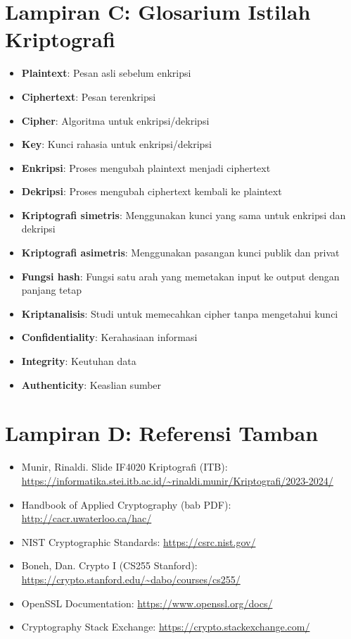 \documentclass[main.tex]{subfiles}
\begin{document}
\section*{Lampiran C: Glosarium Istilah Kriptografi}
\begin{itemize}
  \item \textbf{Plaintext}: Pesan asli sebelum enkripsi
  \item \textbf{Ciphertext}: Pesan terenkripsi
  \item \textbf{Cipher}: Algoritma untuk enkripsi/dekripsi
  \item \textbf{Key}: Kunci rahasia untuk enkripsi/dekripsi
  \item \textbf{Enkripsi}: Proses mengubah plaintext menjadi ciphertext
  \item \textbf{Dekripsi}: Proses mengubah ciphertext kembali ke plaintext
  \item \textbf{Kriptografi simetris}: Menggunakan kunci yang sama untuk enkripsi dan dekripsi
  \item \textbf{Kriptografi asimetris}: Menggunakan pasangan kunci publik dan privat
  \item \textbf{Fungsi hash}: Fungsi satu arah yang memetakan input ke output dengan panjang tetap
  \item \textbf{Kriptanalisis}: Studi untuk memecahkan cipher tanpa mengetahui kunci
  \item \textbf{Confidentiality}: Kerahasiaan informasi
  \item \textbf{Integrity}: Keutuhan data
  \item \textbf{Authenticity}: Keaslian sumber
\end{itemize}

\section*{Lampiran D: Referensi Tamban}
\begin{itemize}
  \item Munir, Rinaldi. Slide IF4020 Kriptografi (ITB): \url{https://informatika.stei.itb.ac.id/~rinaldi.munir/Kriptografi/2023-2024/}
  \item Handbook of Applied Cryptography (bab PDF): \url{http://cacr.uwaterloo.ca/hac/}
  \item NIST Cryptographic Standards: \url{https://csrc.nist.gov/}
  \item Boneh, Dan. Crypto I (CS255 Stanford): \url{https://crypto.stanford.edu/~dabo/courses/cs255/}
  \item OpenSSL Documentation: \url{https://www.openssl.org/docs/}
  \item Cryptography Stack Exchange: \url{https://crypto.stackexchange.com/}
\end{itemize}
\end{document}
